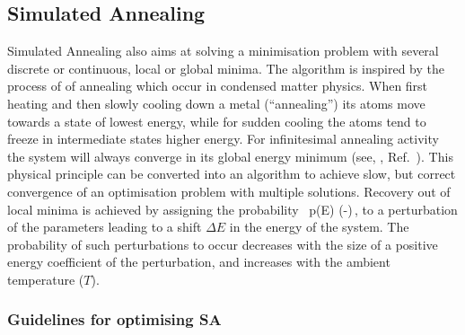 \subsection{Simulated Annealing} 
\label{sec:simAnnealing}

Simulated Annealing also aims at solving a minimisation problem with several 
discrete or continuous, local or global minima. The algorithm is inspired by 
the process of of annealing which occur in condensed matter physics. When 
first heating and then slowly cooling down a metal (``annealing'') its atoms move 
towards a state of lowest energy, while for sudden cooling the atoms tend to freeze in 
intermediate states higher energy. For infinitesimal annealing activity the system will 
always converge in its global energy minimum (see, \eg, Ref.~\cite{VanLaarhovenEA}).
This physical principle can be converted into an algorithm to achieve slow, but 
correct convergence of an optimisation problem with multiple solutions. Recovery 
out of local minima is achieved by assigning the probability~\cite{MetropolisEA} 
\beq
       p(\Delta E) \propto \exp\left(-\right)\,,
\eeq
to a perturbation of the parameters leading to a shift $\Delta E$ 
in the energy of the system. The probability of such perturbations to occur 
decreases with the size of a positive energy coefficient of the perturbation,
and increases with the ambient temperature ($T$).

\subsubsection*{Guidelines for optimising SA}


